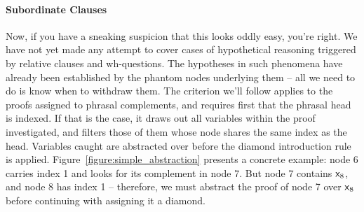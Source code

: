 \paragraph{Subordinate Clauses}
Now, if you have a sneaking suspicion that this looks oddly easy, you're right.
We have not yet made any attempt to cover cases of hypothetical reasoning triggered by relative clauses and wh-questions.
The hypotheses in such phenomena have already been established by the phantom nodes underlying them -- all we need to do is know when to withdraw them.
The criterion we'll follow applies to the proofs assigned to phrasal complements, and requires first that the phrasal head is indexed.
If that is the case, it draws out all variables within the proof investigated, and filters those of them whose node shares the same index as the head.
Variables caught are abstracted over before the diamond introduction rule is applied.
Figure~\ref{figure:simple_abstraction} presents a concrete example: node 6 carries index 1 and looks for its complement in node 7.
But node 7 contains $\mathsf{x}_{\mathnormal{8}}$, and node 8 has index 1 -- therefore, we must abstract the proof of node 7 over $\mathsf{x}_{\mathnormal{8}}$ before continuing with assigning it a diamond.

